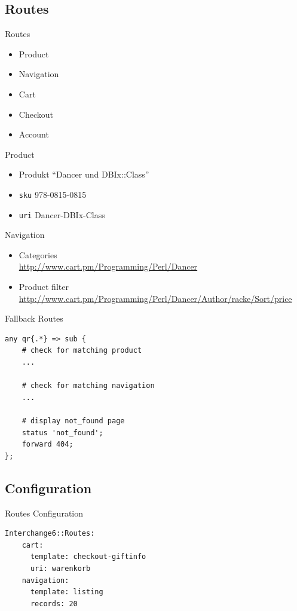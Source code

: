 \subsection{Routes}
\begin{frame}{Routes}
\begin{itemize}
\item Product
\item Navigation
\item Cart
\item Checkout
\item Account
\end{itemize}
\end{frame}

\begin{frame}[fragile]{Product}
\begin{itemize}
\item Produkt ``Dancer und DBIx::Class''\\
\item \verb|sku| 978-0815-0815 \\
\item \verb|uri| Dancer-DBIx-Class
\end{itemize}
\end{frame}

\begin{frame}{Navigation}
\begin{itemize}
\item Categories \\
\url{http://www.cart.pm/Programming/Perl/Dancer}
\item Product filter \\
\url{http://www.cart.pm/Programming/Perl/Dancer/Author/racke/Sort/price}
\end{itemize}
\end{frame}

\begin{frame}[fragile]{Fallback Routes}
\begin{lstlisting}
any qr{.*} => sub {
    # check for matching product
    ...

    # check for matching navigation
    ...

    # display not_found page
    status 'not_found';
    forward 404;
};
\end{lstlisting}
\end{frame}

\subsection{Configuration}
\begin{frame}[fragile]{Routes Configuration}
\begin{lstlisting}
Interchange6::Routes:
    cart:
      template: checkout-giftinfo
      uri: warenkorb
    navigation:
      template: listing
      records: 20
\end{lstlisting}
\end{frame}


